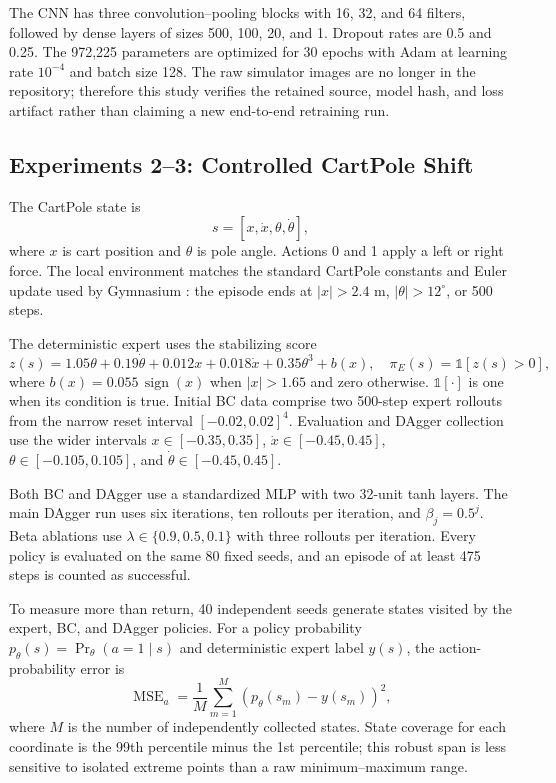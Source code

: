 \documentclass[10pt]{article}
\begin{document}
The CNN has three convolution--pooling blocks with 16, 32, and 64 filters,
followed by dense layers of sizes 500, 100, 20, and 1. Dropout rates are 0.5 and
0.25. The 972,225 parameters are optimized for 30 epochs with Adam at learning
rate $10^{-4}$ and batch size 128. The raw simulator images are no longer in the
repository; therefore this study verifies the retained source, model hash, and
loss artifact rather than claiming a new end-to-end retraining run.

\subsection{Experiments 2--3: Controlled CartPole Shift}

The CartPole state is
\[
  s=[x,\dot{x},\theta,\dot{\theta}],
\]
where $x$ is cart position and $\theta$ is pole angle. Actions 0 and 1 apply a
left or right force. The local environment matches the standard CartPole
constants and Euler update used by Gymnasium \citep{towers2024gymnasium}: the
episode ends at $|x|>2.4$ m, $|\theta|>12^\circ$, or 500 steps.

The deterministic expert uses the stabilizing score
\begin{equation}
  z(s)=1.05\theta+0.19\dot{\theta}+0.012x+0.018\dot{x}
  +0.35\theta^3+b(x),
  \quad
  \pi_E(s)=\mathbb{1}[z(s)>0],
  \label{eq:expert}
\end{equation}
where $b(x)=0.055\,\operatorname{sign}(x)$ when $|x|>1.65$ and zero otherwise.
$\mathbb{1}[\cdot]$ is one when its condition is true. Initial BC data comprise
two 500-step expert rollouts from the narrow reset interval $[-0.02,0.02]^4$.
Evaluation and DAgger collection use the wider intervals
$x\in[-0.35,0.35]$, $\dot{x}\in[-0.45,0.45]$,
$\theta\in[-0.105,0.105]$, and
$\dot{\theta}\in[-0.45,0.45]$.

Both BC and DAgger use a standardized MLP with two 32-unit tanh layers. The main
DAgger run uses six iterations, ten rollouts per iteration, and
$\beta_j=0.5^j$. Beta ablations use $\lambda\in\{0.9,0.5,0.1\}$ with three
rollouts per iteration. Every policy is evaluated on the same 80 fixed seeds,
and an episode of at least 475 steps is counted as successful.

To measure more than return, 40 independent seeds generate states visited by
the expert, BC, and DAgger policies. For a policy probability
$p_\theta(s)=\Pr_\theta(a=1\mid s)$ and deterministic expert label $y(s)$, the
action-probability error is
\begin{equation}
  \operatorname{MSE}_a
  =\frac{1}{M}\sum_{m=1}^{M}
  \left(p_\theta(s_m)-y(s_m)\right)^2,
  \label{eq:action-mse}
\end{equation}
where $M$ is the number of independently collected states. State coverage for
each coordinate is the 99th percentile minus the 1st percentile; this robust
span is less sensitive to isolated extreme points than a raw minimum--maximum
range.
\end{document}
